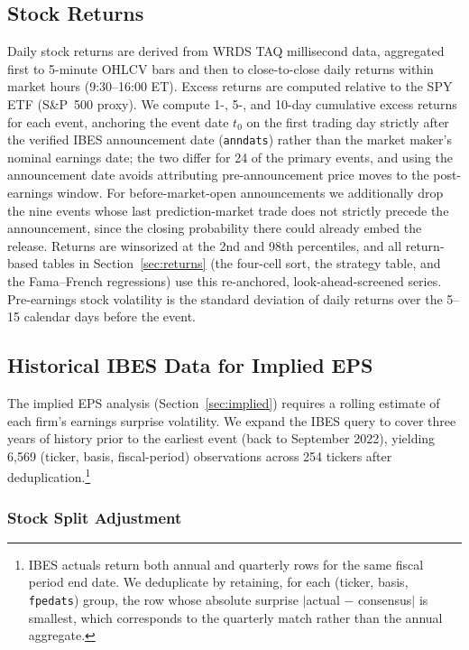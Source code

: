 \documentclass[11pt]{article}
\begin{document}
\subsection{Stock Returns}

Daily stock returns are derived from WRDS TAQ millisecond data, aggregated first to 5-minute OHLCV bars and then to close-to-close daily returns within market hours (9:30--16:00 ET). Excess returns are computed relative to the SPY ETF (S\&P~500 proxy). We compute 1-, 5-, and 10-day cumulative excess returns for each event, anchoring the event date $t_0$ on the first trading day strictly after the verified IBES announcement date (\texttt{anndats}) rather than the market maker's nominal earnings date; the two differ for 24 of the primary events, and using the announcement date avoids attributing pre-announcement price moves to the post-earnings window. For before-market-open announcements we additionally drop the nine events whose last prediction-market trade does not strictly precede the announcement, since the closing probability there could already embed the release. Returns are winsorized at the 2nd and 98th percentiles, and all return-based tables in Section~\ref{sec:returns} (the four-cell sort, the strategy table, and the Fama--French regressions) use this re-anchored, look-ahead-screened series. Pre-earnings stock volatility is the standard deviation of daily returns over the 5--15 calendar days before the event.

\subsection{Historical IBES Data for Implied EPS} \label{sec:ibes_history}

The implied EPS analysis (Section~\ref{sec:implied}) requires a rolling estimate of each firm's earnings surprise volatility. We expand the IBES query to cover three years of history prior to the earliest event (back to September 2022), yielding 6,569 (ticker, basis, fiscal-period) observations across 254 tickers after deduplication.\footnote{IBES actuals return both annual and quarterly rows for the same fiscal period end date. We deduplicate by retaining, for each (ticker, basis, \texttt{fpedats}) group, the row whose absolute surprise $|$actual $-$ consensus$|$ is smallest, which corresponds to the quarterly match rather than the annual aggregate.}

\subsubsection{Stock Split Adjustment}
\end{document}
